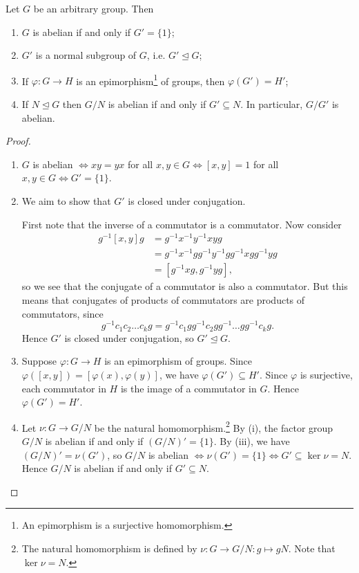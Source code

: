 \begin{lemma}\label{lem:commutator-results}
	Let $G$ be an arbitrary group. Then
	\begin{enumerate}
		\item $G$ is abelian if and only if $G' = \{1\}$;
		\item $G'$ is a normal subgroup of $G$, i.e. $G' \unlhd G$;
		\item If $\varphi : G \to H$ is an epimorphism\footnote{An epimorphism is a surjective homomorphism.} of groups, then $\varphi(G') = H'$;
		\item If $N \unlhd G$ then $G / N$ is abelian if and only if $G' \subseteq N$. In particular, $G / G'$ is abelian.
	\end{enumerate}
	\begin{proof}\hfill
		\begin{enumerate}
			\item $G$ is abelian $\iff xy = yx$ for all $x, y \in G \iff [x, y] = 1$ for all $x, y \in G \iff G' = \{1\}$.
			\item We aim to show that $G'$ is closed under conjugation.
			
			First note that the inverse of a commutator is a commutator. Now consider
			\begin{align*}
				g^{-1}[x, y]g &= g^{-1}x^{-1}y^{-1}xyg \\
					&= g^{-1}x^{-1}g g^{-1}y^{-1}g g^{-1}xg g^{-1}yg \\
					&= [g^{-1}xg, g^{-1}yg],
			\end{align*}
			so we see that the conjugate of a commutator is also a commutator. But this means that conjugates of products of commutators are products of commutators, since
			\[
				g^{-1} c_1 c_2 \dots c_k g = g^{-1} c_1 g g^{-1} c_2 g g^{-1}\dots g g^{-1}c_k g.
			\]
			Hence $G'$ is closed under conjugation, so $G' \unlhd G$.
			\item Suppose $\varphi : G \to H$ is an epimorphism of groups. Since $\varphi([x, y]) = [\varphi(x), \varphi(y)]$, we have $\varphi(G') \subseteq H'$. Since $\varphi$ is surjective, each commutator in $H$ is the image of a commutator in $G$. Hence $\varphi(G') = H'$.
			\item Let $\nu : G \to G / N$ be the natural homomorphism.\footnote{The natural homomorphism is defined by $\nu : G \to G / N : g \mapsto gN$. Note that $\ker{\nu} = N$.} By (i), the factor group $G / N$ is abelian if and only if $(G / N)' = \{1\}$. By (iii), we have $(G / N)' = \nu(G')$, so $G / N$ is abelian $\iff \nu(G') = \{1\} \iff G' \subseteq \ker{\nu} = N$. Hence $G / N$ is abelian if and only if $G' \subseteq N$.
		\end{enumerate}
	\end{proof}
\end{lemma}

